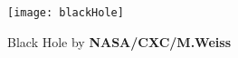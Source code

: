 \documentclass[../tuto-3.tex]{subfiles}
\begin{document}
	
	\maketitle

	\begin{figure}[h]
		\centering
		\texttt{[image: blackHole]}
		\caption{Black Hole by \textbf{NASA/CXC/M.Weiss}}
		\label{fig:blackHolePic}
	\end{figure}

	\pagebreak
	
\end{document}
